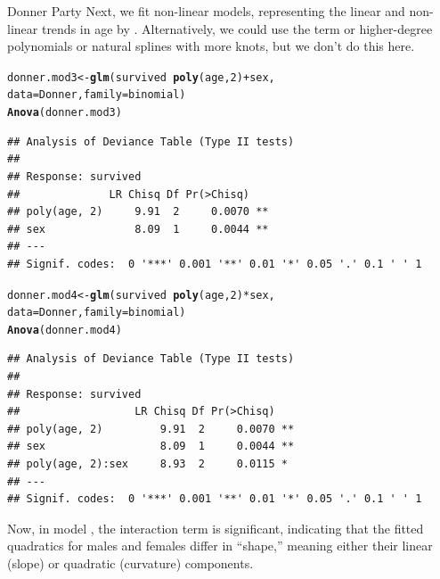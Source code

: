 \documentclass[11pt]{book}\usepackage[]{graphicx}\usepackage[]{color}
\makeatletter
\newcommand{\hlnum}[1]{\textcolor[rgb]{0.686,0.059,0.569}{#1}}%
\newcommand{\hlopt}[1]{\textcolor[rgb]{0,0,0}{#1}}%
\newcommand{\hlstd}[1]{\textcolor[rgb]{0.345,0.345,0.345}{#1}}%
\newcommand{\hlkwb}[1]{\textcolor[rgb]{0.69,0.353,0.396}{#1}}%
\newcommand{\hlkwc}[1]{\textcolor[rgb]{0.333,0.667,0.333}{#1}}%
\newcommand{\hlkwd}[1]{\textcolor[rgb]{0.737,0.353,0.396}{\textbf{#1}}}%
\newenvironment{kframe}{%
 \def\at@end@of@kframe{}%
 \ifinner\ifhmode%
  \def\at@end@of@kframe{\end{minipage}}%
  \begin{minipage}{\columnwidth}%
 \fi\fi%
 \def\FrameCommand##1{\hskip\@totalleftmargin \hskip-\fboxsep
 \colorbox{shadecolor}{##1}\hskip-\fboxsep
     \hskip-\linewidth \hskip-\@totalleftmargin \hskip\columnwidth}%
 \MakeFramed {\advance\hsize-\width
   \@totalleftmargin\z@ \linewidth\hsize
   \@setminipage}}%
 {\par\unskip\endMakeFramed%
 \at@end@of@kframe}
\newenvironment{knitrout}{}{} %
\renewenvironment{knitrout}{\small\renewcommand{\baselinestretch}{.85}}{} %
\makeatother
\begin{document}
\begin{Example}[donner1]{Donner Party}
Next, we fit non-linear models, representing the linear and non-linear
trends in age by .  Alternatively, we could use
the term  or higher-degree polynomials or 
natural splines with more knots, but we don't do this here.
\begin{knitrout}
\color{fgcolor}\begin{kframe}
\begin{alltt}
\hlstd{donner.mod3} \hlkwb{<-} \hlkwd{glm}\hlstd{(survived} \hlopt{~} \hlkwd{poly}\hlstd{(age,}\hlnum{2}\hlstd{)} \hlopt{+} \hlstd{sex,}
                   \hlkwc{data}\hlstd{=Donner,} \hlkwc{family}\hlstd{=binomial)}
\hlkwd{Anova}\hlstd{(donner.mod3)}
\end{alltt}
\begin{verbatim}
## Analysis of Deviance Table (Type II tests)
## 
## Response: survived
##              LR Chisq Df Pr(>Chisq)   
## poly(age, 2)     9.91  2     0.0070 **
## sex              8.09  1     0.0044 **
## ---
## Signif. codes:  0 '***' 0.001 '**' 0.01 '*' 0.05 '.' 0.1 ' ' 1
\end{verbatim}
\begin{alltt}
\hlstd{donner.mod4} \hlkwb{<-} \hlkwd{glm}\hlstd{(survived} \hlopt{~} \hlkwd{poly}\hlstd{(age,}\hlnum{2}\hlstd{)} \hlopt{*} \hlstd{sex,}
                   \hlkwc{data}\hlstd{=Donner,} \hlkwc{family}\hlstd{=binomial)}
\hlkwd{Anova}\hlstd{(donner.mod4)}
\end{alltt}
\begin{verbatim}
## Analysis of Deviance Table (Type II tests)
## 
## Response: survived
##                  LR Chisq Df Pr(>Chisq)   
## poly(age, 2)         9.91  2     0.0070 **
## sex                  8.09  1     0.0044 **
## poly(age, 2):sex     8.93  2     0.0115 * 
## ---
## Signif. codes:  0 '***' 0.001 '**' 0.01 '*' 0.05 '.' 0.1 ' ' 1
\end{verbatim}
\end{kframe}
\end{knitrout}
\noindent Now, in model ,  the interaction term
 is significant, indicating that the 
fitted quadratics for males and females differ in ``shape,''
meaning either their linear (slope) or quadratic (curvature)
components.


\end{Example}
\end{document}
